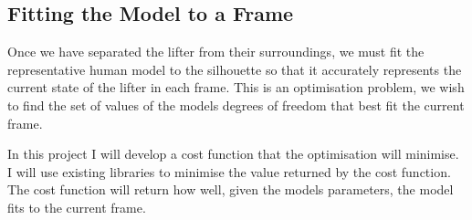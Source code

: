 \subsection{Fitting the Model to a Frame}

Once we have separated the lifter from their surroundings, we must fit the representative human model to the silhouette so that it accurately represents the current state of the lifter in each frame. This is an optimisation problem, we wish to find the set of values of the models degrees of freedom that best fit the current frame.

In this project I will develop a cost function that the optimisation will minimise. I will use existing libraries to minimise the value returned by the cost function. The cost function will return how well, given the models parameters, the model fits to the current frame.